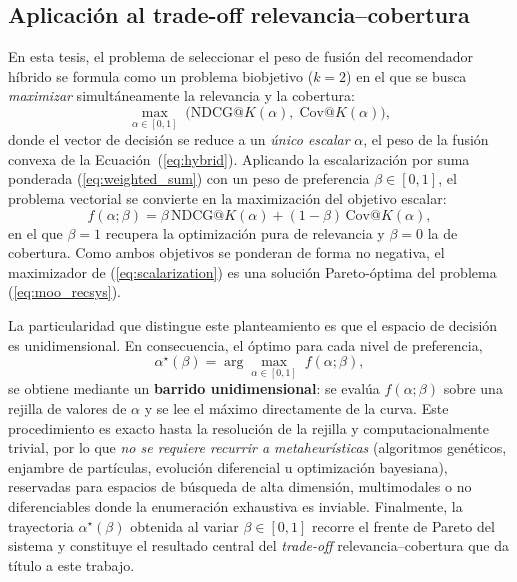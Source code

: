 \subsection{Aplicación al trade-off relevancia--cobertura} \label{subsec:tradeoff}

En esta tesis, el problema de seleccionar el peso de fusión del recomendador híbrido se formula como un problema biobjetivo ($k=2$) en el que se busca \emph{maximizar} simultáneamente la relevancia y la cobertura:
\begin{equation} \label{eq:moo_recsys}
	\max_{\alpha \in [0,1]} \; \bigl(\mathrm{NDCG@}K(\alpha),\; \mathrm{Cov@}K(\alpha)\bigr),
\end{equation}
donde el vector de decisión se reduce a un \emph{único escalar} $\alpha$, el peso de la fusión convexa de la Ecuación~(\ref{eq:hybrid}). Aplicando la escalarización por suma ponderada (\ref{eq:weighted_sum}) con un peso de preferencia $\beta \in [0,1]$, el problema vectorial se convierte en la maximización del objetivo escalar:
\begin{equation} \label{eq:scalarization}
	f(\alpha; \beta) = \beta\, \mathrm{NDCG@}K(\alpha) + (1 - \beta)\, \mathrm{Cov@}K(\alpha),
\end{equation}
en el que $\beta = 1$ recupera la optimización pura de relevancia y $\beta = 0$ la de cobertura. Como ambos objetivos se ponderan de forma no negativa, el maximizador de (\ref{eq:scalarization}) es una solución Pareto-óptima del problema (\ref{eq:moo_recsys}).

La particularidad que distingue este planteamiento es que el espacio de decisión es unidimensional. En consecuencia, el óptimo para cada nivel de preferencia,
\begin{equation} \label{eq:alpha_star}
	\alpha^{\star}(\beta) = \arg\max_{\alpha \in [0,1]} \; f(\alpha; \beta),
\end{equation}
se obtiene mediante un \textbf{barrido unidimensional}: se evalúa $f(\alpha; \beta)$ sobre una rejilla de valores de $\alpha$ y se lee el máximo directamente de la curva. Este procedimiento es exacto hasta la resolución de la rejilla y computacionalmente trivial, por lo que \emph{no se requiere recurrir a metaheurísticas} (algoritmos genéticos, enjambre de partículas, evolución diferencial u optimización bayesiana), reservadas para espacios de búsqueda de alta dimensión, multimodales o no diferenciables donde la enumeración exhaustiva es inviable. Finalmente, la trayectoria $\alpha^{\star}(\beta)$ obtenida al variar $\beta \in [0,1]$ recorre el frente de Pareto del sistema y constituye el resultado central del \textit{trade-off} relevancia--cobertura que da título a este trabajo.


